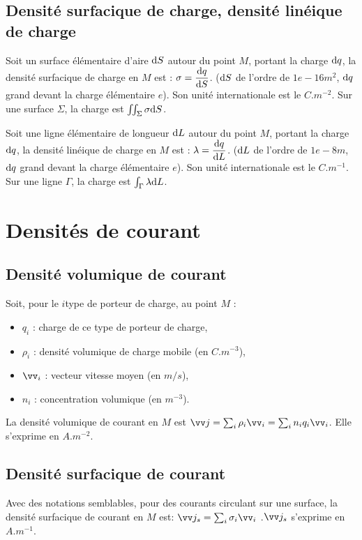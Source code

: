 \subsection{Densité surfacique de charge, densité linéique de charge}
\label{chap9-subsec:densitesurfacique}

Soit un surface élémentaire d'aire $\mathrm{d} S$ autour du point $M$, portant la charge $\mathrm{d} q$, la densité surfacique de charge en $M$ est : $\sigma = \dfrac{\mathrm{d} q}{\mathrm{d} S}$. ($\mathrm{d} S$ de l'ordre de $\si{1e-16}{m^2}$, $\mathrm{d} q$ grand devant la charge élémentaire $e$). Son unité internationale est le $\si{C.m^{-2}}$. Sur une surface $\Sigma$, la charge est $\iint_\Sigma \sigma \mathrm{d} S$.

Soit une ligne élémentaire de longueur $\mathrm{d} L$ autour du point $M$, portant la charge $\mathrm{d} q$, la densité linéique de charge en $M$ est :	$\lambda = \dfrac{\mathrm{d} q}{\mathrm{d} L}$. ($\mathrm{d} L$ de l'ordre de $\si{1e-8}{m}$, $\mathrm{d} q$ grand devant la charge élémentaire $e$). Son unité internationale est le $\si{C.m^{-1}}$. Sur une ligne $\Gamma$, la charge est $\int_\Gamma \lambda \mathrm{d} L$.

\section{Densités de courant}
\label{chap9-sec:densitedecourant}

\subsection{Densité volumique de courant}
\label{chap9-subsec:densitevolumique}

Soit, pour le $i$\ieme type de porteur de charge, au point $M$ :
\begin{itemize}
\item $q_i$ : charge de ce type de porteur de charge,
\item $\rho_i$ : densité volumique de charge mobile (en $\si{C.m^{-3}}$),
\item $\vv_i$ : vecteur vitesse moyen (en $\si{m/s}$),
\item $n_i$ : concentration volumique (en $\si{m^{-3}}$).
\end{itemize}
La densité volumique de courant en $M$ est $\vj = \sum_i \rho_i \vv_i = \sum_i n_i q_i \vv_i$. Elle s'exprime en $\si{A.m^{-2}}$.

\subsection{Densité surfacique de courant}
\label{chap9-subsec:Densité surfacique de courant}
Avec des notations semblables, pour des courants circulant sur une surface, la densité surfacique de courant en $M$ est: $\vj_s = \sum_i \sigma_i \vv_i$ .$\vj_s$ s'exprime en $\si{A.m^{-1}}$.

